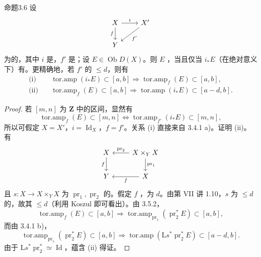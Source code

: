 \begin{SGAresult}{命题}{3.6}
设
\[
\begin{tikzcd}X\arrow[r,"i"]\arrow[d,"f"']&X'\arrow[dl,"f'"]\\Y&\end{tikzcd}
\]
为的，其中 $i$ 是，$f'$ 是；设 $E\in\operatorname{Ob}D(X)$。则 $E$ ，当且仅当 $i_*E$（在绝对意义下）有。更精确地，若 $f'$ 的 $\le d$，则有
\[
\begin{aligned}
\text{(i)}\quad&\operatorname{tor.amp}(i_*E)\subset[a,b]\Longrightarrow\operatorname{tor.amp}_f(E)\subset[a,b],\\
\text{(ii)}\quad&\operatorname{tor.amp}_f(E)\subset[a,b]\Longrightarrow\operatorname{tor.amp}(i_*E)\subset[a-d,b].
\end{aligned}
\]
\end{SGAresult}
\begin{proof}
若 $[m,n]$ 为 $\mathbf Z$ 中的区间，显然有
\[\operatorname{tor.amp}_f(E)\subset[m,n]\Longleftrightarrow\operatorname{tor.amp}_{f'}(i_*E)\subset[m,n],\]
所以可假定 $X=X'$，$i=\operatorname{Id}_X$，$f=f'$。关系 (i) 直接来自 3.4.1 a)。证明 (ii)。有
\[
\begin{tikzcd}X\arrow[d,"f"']&X\times_YX\arrow[l,"\operatorname{pr}_2"']\arrow[d,"\operatorname{pr}_1"]\\Y&X\arrow[l,"f"]\end{tikzcd}
\]
且 $s:X\to X\times_YX$ 为 $\operatorname{pr}_1,\operatorname{pr}_2$ 的。假定 $f$ ，为 $d$。由第 VII 讲 1.10，$s$ 为 $\le d$ 的，故其 $\le d$（利用 Koszul 即可看出）。由 3.5.2，
\[\operatorname{tor.amp}_f(E)\subset[a,b]\Longrightarrow\operatorname{tor.amp}_{\operatorname{pr}_1}(\operatorname{pr}_2^*E)\subset[a,b],\]
而由 3.4.1 b)，
\[\operatorname{tor.amp}_{\operatorname{pr}_1}(\operatorname{pr}_2^*E)\subset[a,b]\Longrightarrow\operatorname{tor.amp}(\mathrm Ls^*\operatorname{pr}_2^*E)\subset[a-d,b].\]
由于 $\mathrm Ls^*\operatorname{pr}_2^*\simeq\operatorname{Id}$，蕴含 (ii) 得证。
\end{proof}

